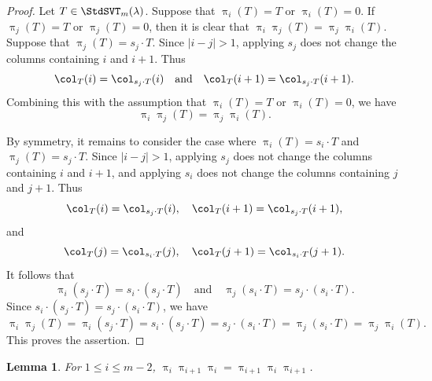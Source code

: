 \documentclass[12pt, reqno]{amsart}
\numberwithin{equation}{section}
\numberwithin{figure}{section}
\numberwithin{table}{section}
\newtheorem{lemma}[theorem]{Lemma}
\theoremstyle{definition}
\begin{document}
\begin{proof}
Let $T\in\StdSVT_m(\lambda)$.
Suppose that $\uppi_i(T)=T$ or $\uppi_i(T)=0$.
If $\uppi_j(T)=T$ or $\uppi_j(T)=0$, then it is clear that $\uppi_i\uppi_j(T) = \uppi_j\uppi_i(T)$.
Suppose that $\uppi_j(T)=s_j\cdot T$.
Since $|i-j|>1$, applying $s_j$ does not change the columns containing $i$ and $i+1$.
Thus
\[
\col_T(i)=\col_{s_j\cdot T}(i)
\quad\text{and}\quad
\col_T(i+1)=\col_{s_j\cdot T}(i+1).
\]
Combining this with the assumption that $\uppi_i(T)=T$ or $\uppi_i(T)=0$, we have
\[
\uppi_i\uppi_j(T)=\uppi_j\uppi_i(T).
\]

By symmetry, it remains to consider the case where $\uppi_i(T)=s_i\cdot T$ and $\uppi_j(T)=s_j\cdot T$.
Since $|i-j|>1$, applying $s_j$ does not change the columns containing $i$ and $i+1$, and applying $s_i$ does not change the columns containing $j$ and $j+1$.
Thus
\[
\col_T(i)=\col_{s_j\cdot T}(i),
\quad
\col_T(i+1)=\col_{s_j\cdot T}(i+1),
\]
and
\[
\col_T(j)=\col_{s_i\cdot T}(j),
\quad
\col_T(j+1)=\col_{s_i\cdot T}(j+1).
\]
It follows that
\[
\uppi_i(s_j\cdot T)=s_i\cdot(s_j\cdot T)
\quad\text{and}\quad
\uppi_j(s_i\cdot T)=s_j\cdot(s_i\cdot T).
\]
Since $s_i\cdot(s_j\cdot T)=s_j\cdot(s_i\cdot T)$, we have
\[
\uppi_i \uppi_j (T)
= \uppi_i(s_j\cdot T)
= s_i\cdot(s_j\cdot T)
= s_j\cdot(s_i\cdot T)
= \uppi_j(s_i\cdot T)
= \uppi_j \uppi_i (T).
\]
This proves the assertion.
\end{proof}

\begin{lemma}\label{lem: svt action braid}
For $1\le i\le m-2$, $\uppi_i\uppi_{i+1}\uppi_i=\uppi_{i+1}\uppi_i\uppi_{i+1}$.
\end{lemma}
\end{document}
